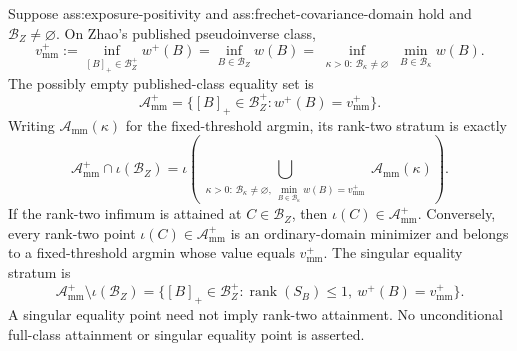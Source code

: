 Suppose ass:exposure-positivity and ass:frechet-covariance-domain hold and \(\mathcal B_Z\ne\varnothing\).  On Zhao's published pseudoinverse class,
\[
v_{\mathrm{mm}}^+
:=\inf_{[B]_+\in\mathcal B_Z^+}w^+(B)
=\inf_{B\in\mathcal B_Z}w(B)
=\inf_{\substack{\kappa>0:\,\mathcal B_\kappa\ne\varnothing}}
\min_{B\in\mathcal B_\kappa}w(B).
\]
The possibly empty published-class equality set is
\[
\mathcal A_{\mathrm{mm}}^+
=\{[B]_+\in\mathcal B_Z^+:w^+(B)=v_{\mathrm{mm}}^+\}.
\]
Writing \(\mathcal A_{\mathrm{mm}}(\kappa)\) for the fixed-threshold argmin, its rank-two stratum is exactly
\[
\mathcal A_{\mathrm{mm}}^+\cap\iota(\mathcal B_Z)
=\iota\!\left(
\bigcup_{\substack{\kappa>0:\,
\mathcal B_\kappa\ne\varnothing,\ 
\min_{B\in\mathcal B_\kappa}w(B)=v_{\mathrm{mm}}^+}}
\mathcal A_{\mathrm{mm}}(\kappa)\right).
\]
If the rank-two infimum is attained at \(C\in\mathcal B_Z\), then \(\iota(C)\in\mathcal A_{\mathrm{mm}}^+\).  Conversely, every rank-two point \(\iota(C)\in\mathcal A_{\mathrm{mm}}^+\) is an ordinary-domain minimizer and belongs to a fixed-threshold argmin whose value equals \(v_{\mathrm{mm}}^+\).  The singular equality stratum is
\[
\mathcal A_{\mathrm{mm}}^+\setminus\iota(\mathcal B_Z)
=\{[B]_+\in\mathcal B_Z^+:\operatorname{rank}(S_B)\le1,\ w^+(B)=v_{\mathrm{mm}}^+\}.
\]
A singular equality point need not imply rank-two attainment.  No unconditional full-class attainment or singular equality point is asserted.